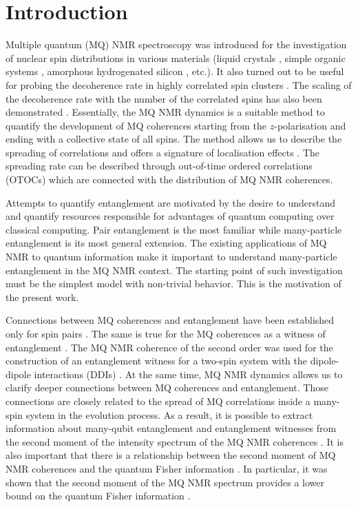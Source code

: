 \documentclass[%
 reprint,
superscriptaddress,
 amsmath,amssymb,
]{revtex4-2}
\begin{document}
\section{Introduction}
Multiple quantum (MQ) NMR spectroscopy \cite{mq_nmr_experiment} was introduced for the investigation of nuclear spin distributions in various materials (liquid crystals \cite{spin_distribution_in_liquid_system}, simple organic systems \cite{mq_nmr_experiment}, amorphous hydrogenated silicon \cite{spin_distribution_in_silicon}, etc.). 
It also turned out to be useful for probing the decoherence rate in highly correlated spin clusters \cite{decoherence_register,decoherence_ca_f2}. 
The scaling of the decoherence rate with the number of the correlated spins has also been demonstrated \cite{decoherence_register,lab:decoherence_2018}. 
Essentially, the MQ NMR dynamics is a suitable method to quantify the development of MQ coherences starting from the $z$-polarisation and ending with a collective state of all spins. 
The method allows us to describe the spreading of correlations \cite{mq_nmr_experiment,spin_distribution_in_liquid_system,decoherence_under_dq,nmr_dyn} and offers a signature of localisation effects \cite{loc_deloc_nmr_dyn,loc_in_chain}. The spreading rate can be described through out-of-time ordered correlations (OTOCs) which are connected with the distribution of MQ NMR coherences. 
\par
Attempts to quantify entanglement are motivated by the
desire to understand and quantify resources responsible for
advantages  of quantum computing over classical computing.
Pair entanglement is the most familiar while many-particle entanglement is its most general extension.
The existing applications of  MQ NMR to quantum information make it important to understand many-particle entanglement in the MQ NMR context.  
The starting point of such investigation must be the simplest model with non-trivial behavior. This is the motivation of the present work.
\par
Connections between MQ coherences and entanglement have been established only for spin pairs \cite{lab:entanglement_dyn_2003,entanglement_dyn,nuclear_polarization_and_entanglement}.  The same is true for the MQ coherences as a witness of entanglement \cite{sep_of_mixed_states}. The MQ NMR coherence of the second order was used for the construction of an entanglement witness for a two-spin system with the dipole-dipole interactions (DDIs) \cite{lab:entanglement_witness_nmr_2008,lab:mq_mnr_qinfo_2012}. At the same time, MQ NMR dynamics allows us to clarify deeper connections between MQ coherences and entanglement. Those connections are closely related to the spread of MQ correlations inside a many-spin system in the evolution process. As a result, it is possible to extract information about many-qubit entanglement and entanglement witnesses from the second moment of the intensity spectrum of the MQ NMR coherences \cite{otoc_to_enanglement_via_mqcoh}. It is also important that there is a relationship between the second moment of MQ NMR coherences and the quantum Fisher information \cite{qmetrology_for_qinfo,qmetrology_nonclassiscal_state}. In particular, it was shown that the second moment of the MQ NMR spectrum provides a lower bound on the quantum Fisher information \cite{otoc_to_enanglement_via_mqcoh}.
\end{document}
